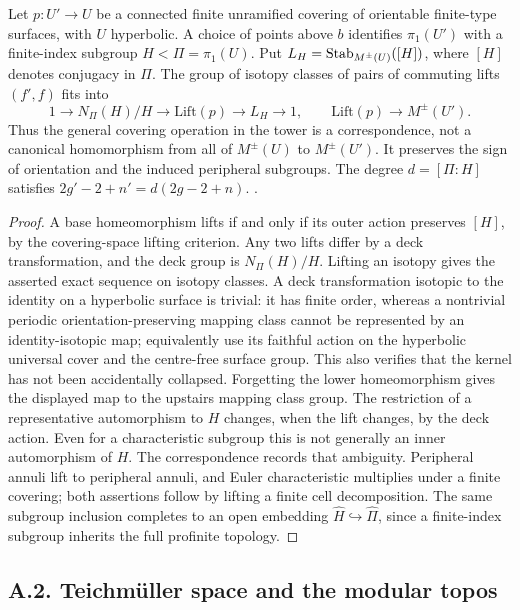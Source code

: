 Let $p:U'\to U$ be a connected finite unramified covering of orientable finite-type surfaces, with $U$ hyperbolic. A choice of points above $b$ identifies $\pi_1(U')$ with a finite-index subgroup $H<\Pi=\pi_1(U)$. Put $L_H=\operatorname{Stab}_{M^{\pm}(U)}([H])$, where $[H]$ denotes conjugacy in $\Pi$. The group of isotopy classes of pairs of commuting lifts $(f',f)$ fits into
\[
1\longrightarrow N_\Pi(H)/H\longrightarrow\mathrm{Lift}(p)
 \longrightarrow L_H\longrightarrow1,
\qquad \mathrm{Lift}(p)\longrightarrow M^{\pm}(U').
\]
Thus the general covering operation in the tower is a correspondence, not a canonical homomorphism from all of $M^{\pm}(U)$ to $M^{\pm}(U')$. It preserves the sign of orientation and the induced peripheral subgroups. The degree $d=[\Pi:H]$ satisfies
$2g'-2+n'=d(2g-2+n)$.
.
\begin{proof}
A base homeomorphism lifts if and only if its outer action preserves $[H]$, by the covering-space lifting criterion. Any two lifts differ by a deck transformation, and the deck group is $N_\Pi(H)/H$. Lifting an isotopy gives the asserted exact sequence on isotopy classes. A deck transformation isotopic to the identity on a hyperbolic surface is trivial: it has finite order, whereas a nontrivial periodic orientation-preserving mapping class cannot be represented by an identity-isotopic map; equivalently use its faithful action on the hyperbolic universal cover and the centre-free surface group. This also verifies that the kernel has not been accidentally collapsed. Forgetting the lower homeomorphism gives the displayed map to the upstairs mapping class group. The restriction of a representative automorphism to $H$ changes, when the lift changes, by the deck action. Even for a characteristic subgroup this is not generally an inner automorphism of $H$. The correspondence records that ambiguity. Peripheral annuli lift to peripheral annuli, and Euler characteristic multiplies under a finite covering; both assertions follow by lifting a finite cell decomposition. The same subgroup inclusion completes to an open embedding $\widehat H\hookrightarrow\widehat\Pi$, since a finite-index subgroup inherits the full profinite topology.
\end{proof}

\subsection{A.2. Teichm\"uller space and the modular topos}

